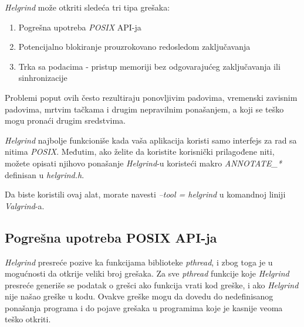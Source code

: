 \documentclass[12pt,oneside]{memoir}
\theoremstyle{plain}
\theoremstyle{definition}
\begin{document}
\textit{Helgrind} može otkriti sledeća tri tipa grešaka:
\begin{enumerate}
	\item Pogrešna upotreba \textit{POSIX} API-ja
	\item Potencijalno blokiranje prouzrokovano redosledom zaključavanja
	\item Trka sa podacima - pristup memoriji bez odgovarajućeg zaključavanja ili sinhronizacije
\end{enumerate}

Problemi poput ovih često rezultiraju ponovljivim padovima, vremenski zavisnim padovima, mrtvim tačkama i drugim nepravilnim ponašanjem, a koji se teško mogu pronaći drugim sredstvima.

\textit{Helgrind} najbolje funkcioniše kada vaša aplikacija koristi samo interfejs za rad sa nitima \textit{POSIX}. Međutim, ako želite da koristite korisnički prilagođene niti, možete opisati njihovo ponašanje \textit{Helgrind}-u koristeći makro \textit{ANNOTATE\_*} definisan u \textit{helgrind.h}.

Da biste koristili ovaj alat, morate navesti \textit{--tool = helgrind} u komandnoj liniji \textit{Valgrind}-a.

\subsection{Pogrešna upotreba POSIX API-ja}
\textit{Helgrind} presreće pozive ka funkcijama biblioteke \textit{pthread}, i zbog toga je u mogućnosti da otkrije veliki broj grešaka. Za sve \textit{pthread} funkcije koje \textit{Helgrind} presreće generiše se podatak o grešci ako funkcija vrati kod greške, i ako \textit{Helgrind} nije našao greške u kodu. Ovakve greške mogu da dovedu do nedefinisanog ponašanja programa i do pojave grešaka u programima koje je kasnije veoma teško otkriti.
\end{document}

